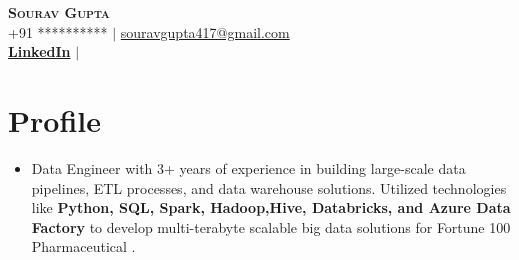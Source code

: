 \documentclass[letterpaper,11pt]{article}
\begin{document}




\begin{center}
    \textbf{\Huge \scshape Sourav Gupta} \\ \vspace{1pt}
    \small +91 ********** $|$ \href{mailto:souravgupta417@gmail.com}{{souravgupta417@gmail.com}}    \\ 
    \small  
    \href{https://www.linkedin.com/in/sourav-gupta-6005b7160/}{\bf LinkedIn} $|$
    
    
\end{center}



\section{Profile}
\begin{itemize}[leftmargin=0.15in, label={}]
\item 
Data Engineer with 3+ years of experience in building large-scale data pipelines, ETL processes, and data warehouse solutions. Utilized technologies like \textbf{Python, SQL, Spark, Hadoop,Hive, Databricks, and Azure Data Factory} to develop multi-terabyte scalable big data solutions for Fortune 100 Pharmaceutical .
\end{itemize}

\end{document}
